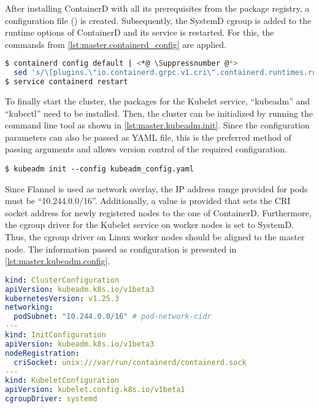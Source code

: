 After installing ContainerD with all its prerequisites from the package registry, a configuration file () is created.
Subsequently, the SystemD \ac{cgroup} is added to the runtime options of ContainerD and its service is restarted. For this, the commands from \autoref{lst:master.containerd_config} are applied.
\\

\begin{lstlisting}[label=lst:master.containerd_config, caption={Bash command for setting up containerd config},language=bash, morekeywords={sudo, kubeadm, tee, service}]
$ containerd config default | <*@ \Suppressnumber @*>
  sed 's/\[plugins.\"io.containerd.grpc.v1.cri\".containerd.runtimes.runc.options\]/&\n SystemdCgroup = true/' | tee /etc/containerd/config.toml >/dev/null <*@ \Reactivatenumber @*>
$ service containerd restart
\end{lstlisting}

To finally start the cluster, the packages for the Kubelet service, \enquote{kubeadm} and \enquote{kubectl} need to be installed. Then, the cluster can be initialized by running the command line tool as shown in \autoref{lst:master.kubeadm.init}. Since the configuration parameters can also be passed as YAML file, this is the preferred method of passing arguments and allows version control of the required configuration.
\begin{lstlisting}[label=lst:master.kubeadm.init, caption={Bash command for setting up the cluster}, morekeywords={sudo, kubeadm}, numbers=none]
$ kubeadm init --config kubeadm_config.yaml
\end{lstlisting}

Since Flannel is used as network overlay, the \ac{IP} address range provided for pods must be \enquote{10.244.0.0/16}\cite{GitHubKubernetesSIGWindowsTools.20230213}. Additionally, a value is provided that sets the \ac{CRI} socket address for newly registered nodes to the one of ContainerD. Furthermore, the \ac{cgroup} driver for the Kubelet service on worker nodes is set to SystemD. Thus, the \ac{cgroup} driver on Linux worker nodes should be aligned to the master node.
The information passed as configuration is presented in \autoref{lst:master.kubeadm.config}.
\begin{lstlisting}[label=lst:master.kubeadm.config, caption={YAML configuration for providing configuration for the cluster and newly registered ndoes. (\textit{Distribution/Controlplane/kubeadm\_config.yaml})}, language=yaml]
kind: ClusterConfiguration
apiVersion: kubeadm.k8s.io/v1beta3
kubernetesVersion: v1.25.3
networking:
  podSubnet: "10.244.0.0/16" # pod-network-cidr
---
kind: InitConfiguration
apiVersion: kubeadm.k8s.io/v1beta3
nodeRegistration:
  criSocket: unix:///var/run/containerd/containerd.sock
---
kind: KubeletConfiguration
apiVersion: kubelet.config.k8s.io/v1beta1
cgroupDriver: systemd
\end{lstlisting}


